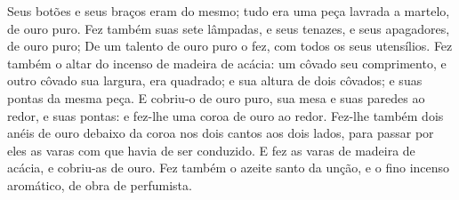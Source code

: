 {Seus botões e seus braços eram do mesmo; tudo era uma peça lavrada a martelo, de ouro puro.
Fez também suas sete lâmpadas, e seus tenazes, e seus apagadores, de ouro puro;
De um talento de ouro puro o fez, com todos os seus utensílios.
Fez também o altar do incenso de madeira de acácia: um côvado seu comprimento, e outro côvado sua largura, era quadrado; e sua altura de dois côvados; e suas pontas da mesma peça.
E cobriu-o de ouro puro, sua mesa e suas paredes ao redor, e suas pontas: e fez-lhe uma coroa de ouro ao redor.
Fez-lhe também dois anéis de ouro debaixo da coroa nos dois cantos aos dois lados, para passar por eles as varas com que havia de ser conduzido.
E fez as varas de madeira de acácia, e cobriu-as de ouro.
Fez também o azeite santo da unção, e o fino incenso aromático, de obra de perfumista.

}
